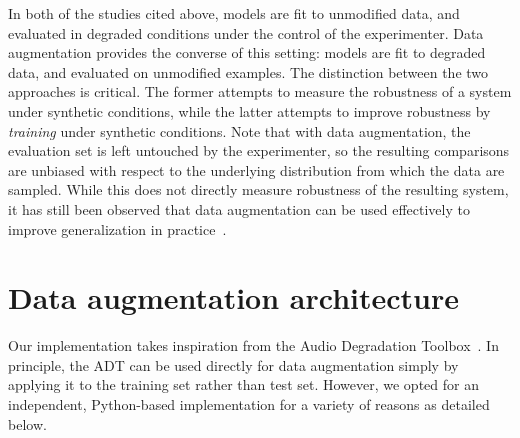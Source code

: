 \documentclass{article}
\begin{document}
In both of the studies cited above, models are fit to unmodified data, and evaluated in
degraded conditions under the control of the experimenter.
Data augmentation provides the converse of this setting: models are fit to degraded data,
and evaluated on unmodified examples.  The distinction between the two approaches is
critical.  The former attempts to measure the robustness of a system under synthetic
conditions, while the latter attempts to improve robustness by \emph{training} under
synthetic conditions. Note that with data augmentation, the evaluation set is left
untouched by the experimenter, so the resulting comparisons are unbiased with respect
to the underlying distribution from which the data are sampled.  While this does not
directly measure robustness of the resulting system, it has still been observed that data
augmentation can be used effectively to improve generalization in
practice~\cite{krizhevsky2012imagenet,he2015delving}.


\section{Data augmentation architecture}

%
%
Our implementation takes inspiration from the Audio Degradation
Toolbox~\cite{mauch2013audio}.  In principle, the ADT can be used directly
for data augmentation simply by applying it to the training set rather than test set.
However, we opted for an independent, Python-based implementation for a variety of
reasons as detailed below.
\end{document}
